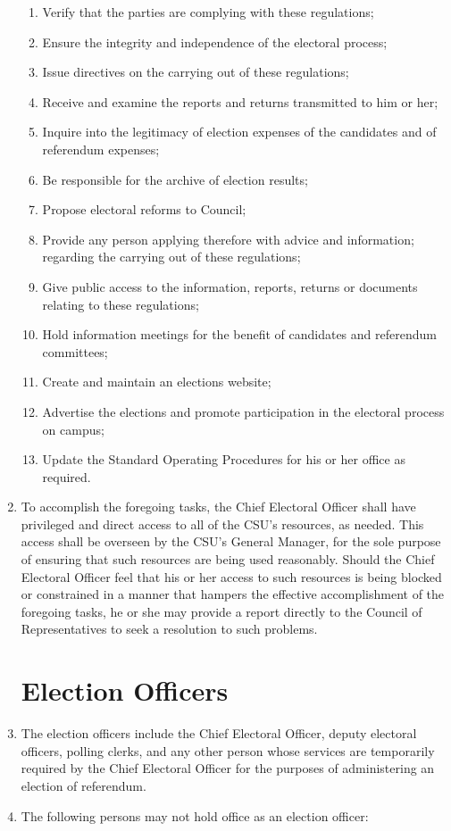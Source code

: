 \documentclass[oneside]{book}
\begin{document}
\begin{enumerate}
\begin{enumerate}
\item Verify that the parties are complying with these regulations; 
\item Ensure the integrity and independence of the electoral process; 
\item Issue directives on the carrying out of these regulations; 
\item Receive and examine the reports and returns transmitted to him or
her; 
\item Inquire into the legitimacy of election expenses of the candidates
and of referendum expenses; 
\item Be responsible for the archive of election results; 
\item Propose electoral reforms to Council; 
\item Provide any person applying therefore with advice and information;
regarding the carrying out of these regulations; 
\item Give public access to the information, reports, returns or documents
relating to these regulations; 
\item Hold information meetings for the benefit of candidates and referendum
committees; 
\item Create and maintain an elections website;
\item Advertise the elections and promote participation in the electoral process on campus;
\item Update the Standard Operating Procedures for his or her office as required.
\end{enumerate}
\item To accomplish the foregoing tasks, the Chief Electoral Officer shall have privileged and direct access 
to all of the CSU’s resources, as needed. This access shall be overseen by the CSU’s General 
Manager, for the sole purpose of ensuring that such resources are being used reasonably. Should 
the Chief Electoral Officer feel that his or her access to such resources is being blocked or
constrained in a manner that hampers the effective accomplishment of the foregoing tasks, he or she
may provide a report directly to the Council of Representatives to seek a resolution to such
problems.
\section{\label{Election_Officers}Election Officers }
\item The election officers include the Chief Electoral Officer, deputy
electoral officers, polling clerks, and any other person whose services
are temporarily required by the Chief Electoral Officer for the purposes
of administering an election of referendum. 
\item The following persons may not hold office as an election officer: 


\end{enumerate}
\end{document}
